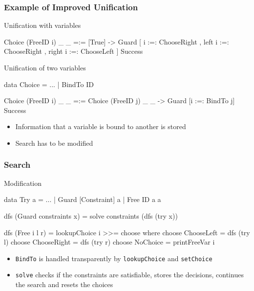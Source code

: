 \documentclass[utf8]{beamer}
\newenvironment{program}{\begin{semiverbatim}\small}{\end{semiverbatim}}
\begin{document}
\begin{frame}[fragile]
\frametitle{Example of Improved Unification}
\begin{block}{Unification with variables}
\begin{program}
Choice (FreeID i) _ _ =:= [True] 
-> Guard [ i       :=: ChooseRight      
         , left i  :=: ChooseRight
         , right i :=: ChooseLeft
         ] Success
\end{program}
\end{block}
\pause
\begin{block}{Unification of two variables}
\begin{program}
data Choice = ... | BindTo ID

Choice (FreeID i) _ _ =:= Choice (FreeID j) _ _
-> Guard [i :=: BindTo j] Success
\end{program}
\end{block}
\begin{itemize}
\item Information that a variable is bound to another is stored
\item Search has to be modified
\end{itemize}
\end{frame}



\begin{frame}[fragile]

\frametitle{Search}

\begin{block}{Modification}
\begin{program}

data Try a = ... | Guard [Constraint] a | Free ID a a

dfs (Guard constraints x) = solve constraints (dfs (try x))

dfs (Free i l r) = lookupChoice i >>= choose
   where choose ChooseLeft  = dfs (try l)
         choose ChooseRight = dfs (try r)
         choose NoChoice    = printFreeVar i
\end{program}
\end{block}

\begin{itemize}
\item \verb!BindTo! is handled transparently by
      \verb!lookupChoice! and \verb!setChoice!
\item \verb!solve! checks if the constraints are satisfiable,
      stores the decisions, continues the search and resets the choices
\end{itemize}
\end{frame}
\end{document}
